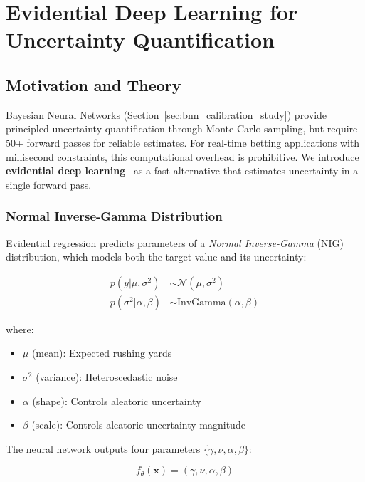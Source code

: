 \section{Evidential Deep Learning for Uncertainty Quantification}
\label{sec:evidential_learning}

\subsection{Motivation and Theory}

Bayesian Neural Networks (Section~\ref{sec:bnn_calibration_study}) provide principled uncertainty quantification through Monte Carlo sampling, but require 50+ forward passes for reliable estimates. For real-time betting applications with millisecond constraints, this computational overhead is prohibitive. We introduce \textbf{evidential deep learning}~\citep{amini2020deep, sensoy2018evidential} as a fast alternative that estimates uncertainty in a single forward pass.

\subsubsection{Normal Inverse-Gamma Distribution}

Evidential regression predicts parameters of a \textit{Normal Inverse-Gamma} (NIG) distribution, which models both the target value and its uncertainty:

\begin{align}
    p(y | \mu, \sigma^2) &\sim \mathcal{N}(\mu, \sigma^2) \label{eq:nig_normal} \\
    p(\sigma^2 | \alpha, \beta) &\sim \text{InvGamma}(\alpha, \beta) \label{eq:nig_invgamma}
\end{align}

\noindent where:
\begin{itemize}[nosep]
    \item $\mu$ (mean): Expected rushing yards
    \item $\sigma^2$ (variance): Heteroscedastic noise
    \item $\alpha$ (shape): Controls aleatoric uncertainty
    \item $\beta$ (scale): Controls aleatoric uncertainty magnitude
\end{itemize}

The neural network outputs four parameters $\{\gamma, \nu, \alpha, \beta\}$:

\begin{equation}
    f_\theta(\mathbf{x}) = (\gamma, \nu, \alpha, \beta)
    \label{eq:evidential_output}
\end{equation}

